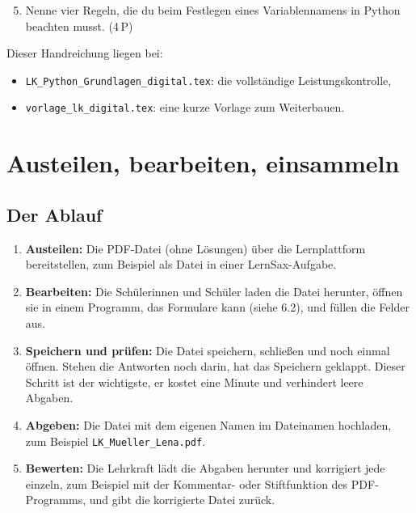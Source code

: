 \begin{Form}
\begin{ausgabe}
\begin{enumerate}[(1)]
  \setcounter{enumi}{4}
  \item Nenne vier Regeln, die du beim Festlegen eines Variablennamens in
  Python beachten musst. \hfill (4\,P)
\end{enumerate}
\end{ausgabe}


Dieser Handreichung liegen bei:

\begin{itemize}
	\item \texttt{LK\_Python\_Grundlagen\_digital.tex}: die vollständige Leistungskontrolle,
	\item \texttt{vorlage\_lk\_digital.tex}: eine kurze Vorlage zum Weiterbauen.
\end{itemize}



\section{Austeilen, bearbeiten, einsammeln}

\subsection{Der Ablauf}

\begin{enumerate}[(1)]
	\item \textbf{Austeilen:} Die PDF-Datei (ohne Lösungen) über die
	Lernplattform bereitstellen, zum Beispiel als Datei in einer LernSax-Aufgabe.
	\item \textbf{Bearbeiten:} Die Schülerinnen und Schüler laden die Datei
	herunter, öffnen sie in einem Programm, das Formulare kann (siehe 6.2),
	und füllen die Felder aus.
	\item \textbf{Speichern und prüfen:} Die Datei speichern, schließen und
	noch einmal öffnen. Stehen die Antworten noch darin, hat das Speichern
	geklappt. Dieser Schritt ist der wichtigste, er kostet eine Minute und
	verhindert leere Abgaben.
	\item \textbf{Abgeben:} Die Datei mit dem eigenen Namen im Dateinamen
	hochladen, zum Beispiel \texttt{LK\_Mueller\_Lena.pdf}.
	\item \textbf{Bewerten:} Die Lehrkraft lädt die Abgaben herunter und
	korrigiert jede einzeln, zum Beispiel mit der Kommentar- oder Stiftfunktion
	des PDF-Programms, und gibt die korrigierte Datei zurück.
\end{enumerate}


\end{Form}

